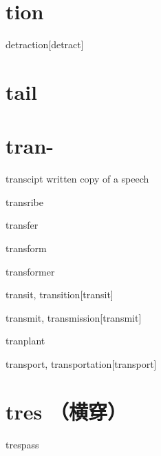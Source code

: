 \section{tion}

\begin{RefWord}{detraction}[detract]
\end{RefWord}

\section{tail}



\section{tran-}

\begin{RefWord}{transcipt}
    written copy of a speech
\end{RefWord}

\begin{RefWord}{transribe}
\end{RefWord}

\begin{RefWord}{transfer}
\end{RefWord}

\begin{RefWord}{transform}
\end{RefWord}

\begin{RefWord}{transformer}
\end{RefWord}

\begin{RefWord}{transit, transition}[transit]
\end{RefWord}

\begin{RefWord}{transmit, transmission}[transmit]
\end{RefWord}

\begin{RefWord}{tranplant}
\end{RefWord}

\begin{RefWord}{transport, transportation}[transport]
\end{RefWord}

\section{tres （横穿）}

\begin{RefWord}{trespass}
\end{RefWord}